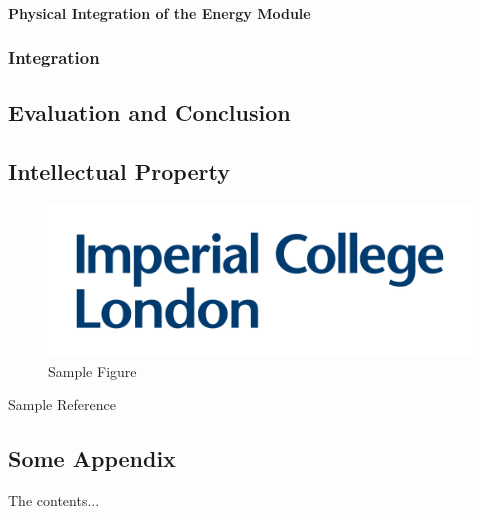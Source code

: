 \documentclass[a4paper]{article}
\begin{document}
\subsubsection{Physical Integration of the Energy Module}


\subsection{Integration}



\section{Evaluation and Conclusion}

\section{Intellectual Property}

\newpage

\printbibliography[
heading=bibintoc,
title={References}
]


\begin{figure}[H]
\centering
\includegraphics[scale=0.18]{logo.png}
\caption{Sample Figure}
\label{fig:image1}
\end{figure}

Sample Reference\cite{einstein}


\begin{appendices}
\chapter{Some Appendix}
The contents...
\end{appendices}
\end{document}
